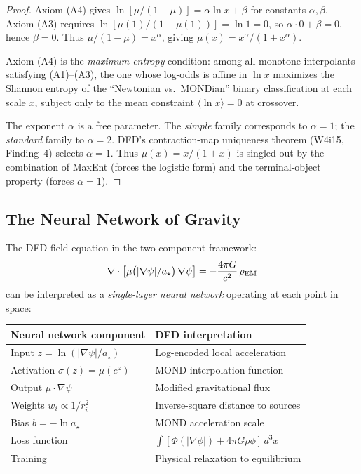 \documentclass[11pt]{article}
\theoremstyle{definition}
\theoremstyle{remark}
\newcommand{\astar}{a_\star}
\begin{document}
\begin{proof}
Axiom (A4) gives $\ln[\mu/(1-\mu)] = \alpha \ln x + \beta$ for
constants $\alpha, \beta$. Axiom (A3) requires
$\ln[\mu(1)/(1-\mu(1))] = \ln 1 = 0$, so $\alpha \cdot 0 + \beta = 0$,
hence $\beta = 0$. Thus $\mu/(1-\mu) = x^\alpha$, giving
$\mu(x) = x^\alpha / (1 + x^\alpha)$.

Axiom (A4) is the \emph{maximum-entropy} condition: among all monotone
interpolants satisfying (A1)--(A3), the one whose log-odds is affine in
$\ln x$ maximizes the Shannon entropy of the ``Newtonian vs.\ MONDian''
binary classification at each scale $x$, subject only to the mean
constraint $\langle \ln x \rangle = 0$ at crossover.

The exponent $\alpha$ is a free parameter. The \emph{simple} family
corresponds to $\alpha = 1$; the \emph{standard} family to $\alpha = 2$.
DFD's contraction-map uniqueness theorem (W4i15, Finding~4) selects
$\alpha = 1$. Thus $\mu(x) = x/(1+x)$ is singled out by the
combination of MaxEnt (forces the logistic form) and the terminal-object
property (forces $\alpha = 1$).
\end{proof}

\subsection{The Neural Network of Gravity}

The DFD field equation in the two-component framework:
\begin{equation}
  \nabla \cdot \bigl[\mu\bigl(|\nabla\psi|/\astar\bigr)\,\nabla\psi\bigr]
  = -\frac{4\pi G}{c^2}\,\rho_{\rm EM}
  \label{eq:field-eq}
\end{equation}
can be interpreted as a \emph{single-layer neural network} operating at
each point in space:

\begin{center}
\begin{tabular}{ll}
\toprule
\textbf{Neural network component} & \textbf{DFD interpretation} \\
\midrule
Input $z = \ln(|\nabla\psi|/\astar)$ & Log-encoded local acceleration \\
Activation $\sigma(z) = \mu(e^z)$ & MOND interpolation function \\
Output $\mu \cdot \nabla\psi$ & Modified gravitational flux \\
Weights $w_i \propto 1/r_i^2$ & Inverse-square distance to sources \\
Bias $b = -\ln \astar$ & MOND acceleration scale \\
Loss function & $\int [\Phi(|\nabla\phi|) + 4\pi G\rho\phi]\,d^3x$ \\
Training & Physical relaxation to equilibrium \\
\bottomrule
\end{tabular}
\end{center}
\end{document}
